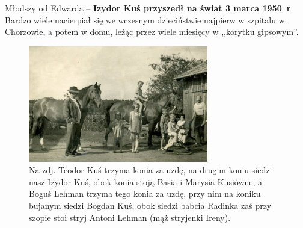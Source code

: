 Młodszy od Edwarda -- \textbf{Izydor Kuś przyszedł na świat 3 marca 1950~r}. Bardzo wiele nacierpiał się we wczesnym dzieciństwie najpierw w szpitalu w Chorzowie, a potem w domu, leżąc przez wiele miesięcy w ,,korytku gipsowym''.
\begin{figure} [!h]
\begin{center}
\includegraphics[width=0.7\textwidth]{photo/izydor_kus_1.jpg}
\caption[Kusiowie przy koniach]{Na zdj. Teodor Kuś trzyma konia za uzdę, na drugim koniu siedzi nasz Izydor Kuś, obok konia stoją Basia i Marysia Kusiówne, a Boguś Lehman trzyma tego konia za uzdę, przy nim na koniku bujanym siedzi Bogdan Kuś, obok siedzi babcia Radinka zaś przy szopie stoi stryj Antoni Lehman (mąż stryjenki Ireny).}
\label{rys:izydor_kus_1}
\end{center}
\end{figure}

